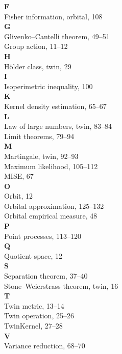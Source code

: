 \documentclass[11pt,twoside,openright]{book}
\theoremstyle{plain}
\theoremstyle{definition}
\theoremstyle{remark}
\begin{document}
\textbf{F}\\
Fisher information, orbital, 108\\

\textbf{G}\\
Glivenko--Cantelli theorem, 49--51\\
Group action, 11--12\\

\textbf{H}\\
Hölder class, twin, 29\\

\textbf{I}\\
Isoperimetric inequality, 100\\

\textbf{K}\\
Kernel density estimation, 65--67\\

\textbf{L}\\
Law of large numbers, twin, 83--84\\
Limit theorems, 79--94\\

\textbf{M}\\
Martingale, twin, 92--93\\
Maximum likelihood, 105--112\\
MISE, 67\\

\textbf{O}\\
Orbit, 12\\
Orbital approximation, 125--132\\
Orbital empirical measure, 48\\

\textbf{P}\\
Point processes, 113--120\\

\textbf{Q}\\
Quotient space, 12\\

\textbf{S}\\
Separation theorem, 37--40\\
Stone--Weierstrass theorem, twin, 16\\

\textbf{T}\\
Twin metric, 13--14\\
Twin operation, 25--26\\
TwinKernel, 27--28\\

\textbf{V}\\
Variance reduction, 68--70\\
\end{document}
